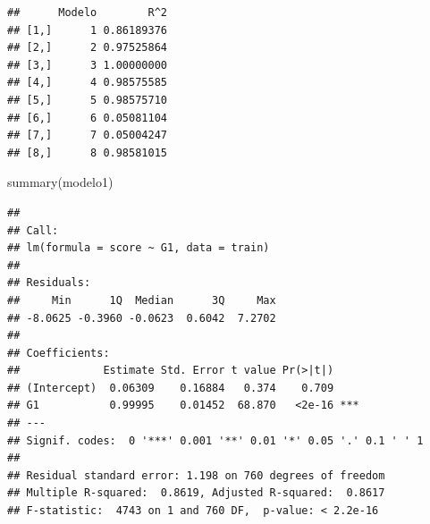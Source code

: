 \documentclass[]{article}
\newenvironment{Shaded}{\begin{snugshade}}{\end{snugshade}}
\newcommand{\DataTypeTok}[1]{\textcolor[rgb]{0.87,0.87,0.75}{#1}}
\newcommand{\DecValTok}[1]{\textcolor[rgb]{0.86,0.86,0.80}{#1}}
\newcommand{\KeywordTok}[1]{\textcolor[rgb]{0.94,0.87,0.69}{#1}}
\newcommand{\NormalTok}[1]{\textcolor[rgb]{0.80,0.80,0.80}{#1}}
\newcommand{\OperatorTok}[1]{\textcolor[rgb]{0.94,0.94,0.82}{#1}}
\newcommand{\OtherTok}[1]{\textcolor[rgb]{0.94,0.94,0.56}{#1}}
\newcommand{\StringTok}[1]{\textcolor[rgb]{0.80,0.58,0.58}{#1}}
\begin{document}
\begin{Shaded}
\end{Shaded}

\begin{verbatim}
##      Modelo        R^2
## [1,]      1 0.86189376
## [2,]      2 0.97525864
## [3,]      3 1.00000000
## [4,]      4 0.98575585
## [5,]      5 0.98575710
## [6,]      6 0.05081104
## [7,]      7 0.05004247
## [8,]      8 0.98581015
\end{verbatim}

\begin{Shaded}
\begin{Highlighting}[]
\KeywordTok{summary}\NormalTok{(modelo1)}
\end{Highlighting}
\end{Shaded}

\begin{verbatim}
## 
## Call:
## lm(formula = score ~ G1, data = train)
## 
## Residuals:
##     Min      1Q  Median      3Q     Max 
## -8.0625 -0.3960 -0.0623  0.6042  7.2702 
## 
## Coefficients:
##             Estimate Std. Error t value Pr(>|t|)    
## (Intercept)  0.06309    0.16884   0.374    0.709    
## G1           0.99995    0.01452  68.870   <2e-16 ***
## ---
## Signif. codes:  0 '***' 0.001 '**' 0.01 '*' 0.05 '.' 0.1 ' ' 1
## 
## Residual standard error: 1.198 on 760 degrees of freedom
## Multiple R-squared:  0.8619, Adjusted R-squared:  0.8617 
## F-statistic:  4743 on 1 and 760 DF,  p-value: < 2.2e-16
\end{verbatim}
\end{document}
